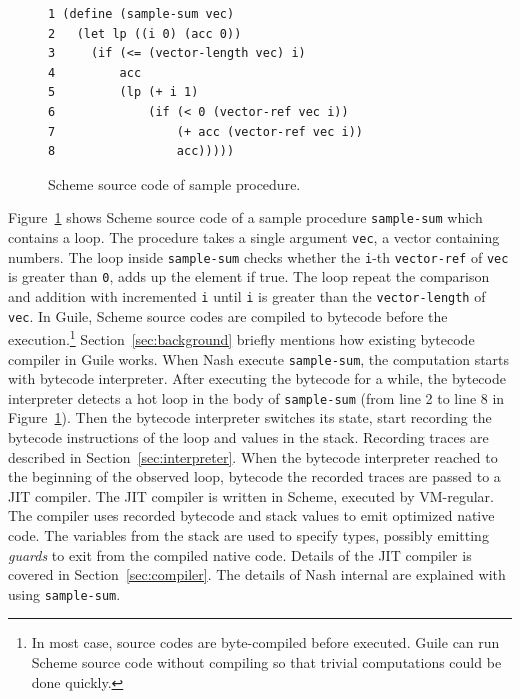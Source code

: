 \documentclass[preprint, 10pt]{sigplanconf}
\begin{document}
\begin{figure}
  \begin{center}
    \small
\begin{verbatim}
1 (define (sample-sum vec)
2   (let lp ((i 0) (acc 0))
3     (if (<= (vector-length vec) i)
4         acc
5         (lp (+ i 1)
6             (if (< 0 (vector-ref vec i))
7                 (+ acc (vector-ref vec i))
8                 acc)))))
\end{verbatim}
\end{center}
\caption{Scheme source code of sample procedure.}
\label{fig:scmloop}
\end{figure}

Figure~\hyperref[fig:scmloop]{\ref{fig:scmloop}} shows Scheme source code of a
sample procedure \texttt{sample-sum} which contains a loop. The procedure
takes a single argument \texttt{vec}, a vector containing numbers. The loop
inside \texttt{sample-sum} checks whether the \texttt{i}-th
\texttt{vector-ref} of \texttt{vec} is greater than \texttt{0}, adds up the
element if true. The loop repeat the comparison and addition with incremented
\texttt{i} until \texttt{i} is greater than the \texttt{vector-length} of
\texttt{vec}. In Guile, Scheme source codes are compiled to bytecode before
the execution.\footnote{In most case, source codes are byte-compiled before
  executed. Guile can run Scheme source code without compiling so that trivial
  computations could be done quickly.}
Section~\hyperref[sec:background]{\ref{sec:background}} briefly mentions how
existing bytecode compiler in Guile works. When Nash execute
\texttt{sample-sum}, the computation starts with bytecode interpreter. After
executing the bytecode for a while, the bytecode interpreter detects a hot
loop in the body of \texttt{sample-sum} (from line 2 to line 8 in
Figure~\hyperref[fig:scmloop]{\ref{fig:scmloop}}). Then the bytecode
interpreter switches its state, start recording the bytecode instructions of
the loop and values in the stack. Recording traces are described in
Section~\hyperref[sec:interpreter]{\ref{sec:interpreter}}. When the bytecode
interpreter reached to the beginning of the observed loop, bytecode the
recorded traces are passed to a JIT compiler. The JIT compiler is written in
Scheme, executed by VM-regular. The compiler uses recorded bytecode and stack
values to emit optimized native code. The variables from the stack are used to
specify types, possibly emitting \textit{guards} to exit from the compiled
native code. Details of the JIT compiler is covered in
Section~\hyperref[sec:compiler]{\ref{sec:compiler}}. The details of Nash
internal are explained with using \texttt{sample-sum}.
\end{document}
